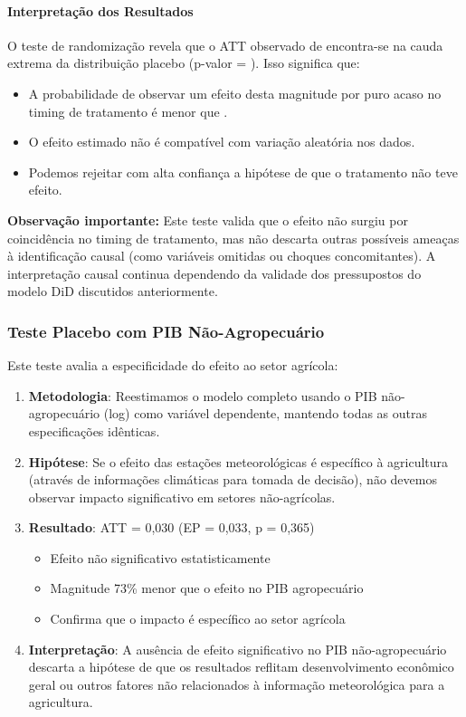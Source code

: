 \documentclass[
	12pt,				%
	oneside,			%
	a4paper,			%
	english,			%
	french,				%
	spanish,			%
	brazil				%
	]{abntex2}
\begin{document}
\paragraph{Interpretação dos Resultados}

O teste de randomização revela que o ATT observado de \placebotruatt{} encontra-se na cauda extrema da distribuição placebo (p-valor = \placebopvalue). Isso significa que:

\begin{itemize}
\item A probabilidade de observar um efeito desta magnitude por puro acaso no timing de tratamento é menor que \placebopvaluepct{}.
\item O efeito estimado não é compatível com variação aleatória nos dados.
\item Podemos rejeitar com alta confiança a hipótese de que o tratamento não teve efeito.
\end{itemize}

\textbf{Observação importante:} Este teste valida que o efeito não surgiu por coincidência no timing de tratamento, mas não descarta outras possíveis ameaças à identificação causal (como variáveis omitidas ou choques concomitantes). A interpretação causal continua dependendo da validade dos pressupostos do modelo DiD discutidos anteriormente.

\subsubsection{Teste Placebo com PIB Não-Agropecuário}

Este teste avalia a especificidade do efeito ao setor agrícola:

\begin{enumerate}
\item \textbf{Metodologia}: Reestimamos o modelo completo usando o PIB não-agropecuário (log) como variável dependente, mantendo todas as outras especificações idênticas.

\item \textbf{Hipótese}: Se o efeito das estações meteorológicas é específico à agricultura (através de informações climáticas para tomada de decisão), não devemos observar impacto significativo em setores não-agrícolas.

\item \textbf{Resultado}: ATT = 0,030 (EP = 0,033, p = 0,365)
\begin{itemize}
\item Efeito não significativo estatisticamente
\item Magnitude 73\% menor que o efeito no PIB agropecuário
\item Confirma que o impacto é específico ao setor agrícola
\end{itemize}

\item \textbf{Interpretação}: A ausência de efeito significativo no PIB não-agropecuário descarta a hipótese de que os resultados reflitam desenvolvimento econômico geral ou outros fatores não relacionados à informação meteorológica para a agricultura.
\end{enumerate}
\end{document}
